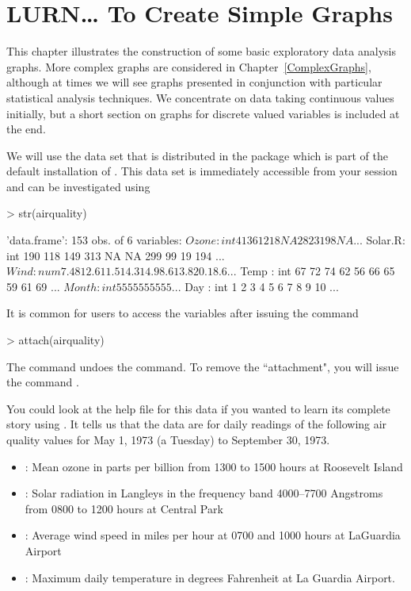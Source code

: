 \chapter{LURN\ldots{} To Create Simple Graphs}
\label{SimpleGraphs}





This chapter illustrates the construction of some basic exploratory data analysis graphs. More complex graphs are considered in Chapter~\ref{ComplexGraphs}, although at times we will see graphs presented in conjunction with particular statistical analysis techniques. We concentrate on data taking continuous values initially, but a short section on graphs for discrete valued variables is included at the end.

We will use the  data set that is distributed in the  package which is part of the default installation of \R{}. This data set is immediately accessible from your \R{} session and can be investigated using
\begin{Schunk}
\begin{Sinput}
> str(airquality)
\end{Sinput}
\begin{Soutput}
'data.frame':	153 obs. of  6 variables:
 $ Ozone  : int  41 36 12 18 NA 28 23 19 8 NA ...
 $ Solar.R: int  190 118 149 313 NA NA 299 99 19 194 ...
 $ Wind   : num  7.4 8 12.6 11.5 14.3 14.9 8.6 13.8 20.1 8.6 ...
 $ Temp   : int  67 72 74 62 56 66 65 59 61 69 ...
 $ Month  : int  5 5 5 5 5 5 5 5 5 5 ...
 $ Day    : int  1 2 3 4 5 6 7 8 9 10 ...
\end{Soutput}
\end{Schunk}
It is common for \R{} users to access the variables after issuing the command
\begin{Schunk}
\begin{Sinput}
> attach(airquality)
\end{Sinput}
\end{Schunk}
The  command undoes the  command. To remove the ``attachment", you will issue the command .

You could look at the help file for this data if you wanted to learn its complete story using . It tells us that the data are for daily readings of the following air quality values for May 1, 1973 (a
Tuesday) to September 30, 1973.
\begin{itemize}
\item {}: Mean ozone in parts per
billion from 1300 to 1500 hours at Roosevelt Island
\item {}: Solar radiation
in Langleys in the frequency band 4000--7700 Angstroms from
0800 to 1200 hours at Central Park
\item {}: Average wind speed in miles
per hour at 0700 and 1000 hours at LaGuardia Airport
\item {}: Maximum daily
temperature in degrees Fahrenheit at La Guardia Airport.
\end{itemize}

